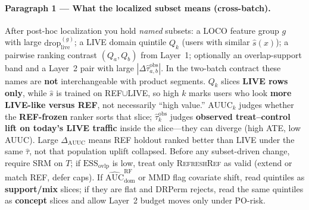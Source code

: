 \documentclass{article}
\begin{document}
\paragraph{Paragraph 1 --- What the localized subset means (cross-batch).}
After post-hoc localization you hold \emph{named} subsets: a LOCO feature group $g$ with large $\mathrm{drop}_{\mathrm{live}}^{(g)}$; a LIVE domain quintile $Q_k$ (users with similar $\hat s(x)$); a pairwise ranking contrast $(Q_a,Q_b)$ from Layer~1; optionally an overlap-support band and a Layer~2 pair with large $|\Delta\widehat{\tau}^{\mathrm{obs}}_{a,b}|$.
In the two-batch contract these names are \textbf{not} interchangeable with product segments.
$Q_k$ slices \textbf{LIVE rows only}, while $\hat s$ is trained on REF$\cup$LIVE, so high $k$ marks users who look \textbf{more LIVE-like versus REF}, not necessarily ``high value.''
$\mathrm{AUUC}_k$ judges whether the \textbf{REF-frozen} ranker sorts that slice; $\widehat{\tau}^{\mathrm{obs}}_k$ judges \textbf{observed treat--control lift on today's LIVE traffic} inside the slice---they can diverge (high ATE, low AUUC).
Large $\Delta_{\mathrm{AUUC}}$ means REF holdout ranked better than LIVE under the same $\hat\tau$, not that population uplift collapsed.
Before any subset-driven change, require SRM on $T$; if $\mathrm{ESS}_{\mathrm{ovlp}}$ is low, treat only \textsc{RefreshRef} as valid (extend or match REF, defer caps).
If $\widehat{\mathrm{AUC}}_{\mathrm{dom}}^{\mathrm{RF}}$ or MMD flag covariate shift, read quintiles as \textbf{support/mix} slices; if they are flat and DRPerm rejects, read the same quintiles as \textbf{concept} slices and allow Layer~2 budget moves only under PO-risk.
\end{document}
